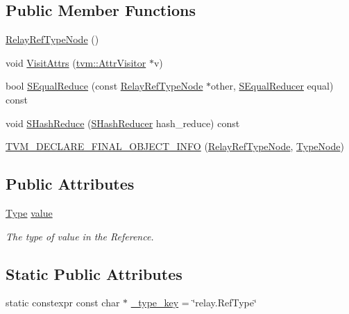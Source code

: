 \subsection*{Public Member Functions}
\begin{DoxyCompactItemize}
\item 
\hyperlink{classtvm_1_1RelayRefTypeNode_a23840592da71d366e7f7dbaaf42d906d}{Relay\+Ref\+Type\+Node} ()
\item 
void \hyperlink{classtvm_1_1RelayRefTypeNode_a365f797bb929e42a2199b51ed2f879f0}{Visit\+Attrs} (\hyperlink{classtvm_1_1AttrVisitor}{tvm\+::\+Attr\+Visitor} $\ast$v)
\item 
bool \hyperlink{classtvm_1_1RelayRefTypeNode_abe200e4f22df8db45ac083544df1f08f}{S\+Equal\+Reduce} (const \hyperlink{classtvm_1_1RelayRefTypeNode}{Relay\+Ref\+Type\+Node} $\ast$other, \hyperlink{classtvm_1_1SEqualReducer}{S\+Equal\+Reducer} equal) const 
\item 
void \hyperlink{classtvm_1_1RelayRefTypeNode_a70e4a9a304f6cd763ea25168fbea43d4}{S\+Hash\+Reduce} (\hyperlink{classtvm_1_1SHashReducer}{S\+Hash\+Reducer} hash\+\_\+reduce) const 
\item 
\hyperlink{classtvm_1_1RelayRefTypeNode_ac5cbe55647c2f0fe3158c9204c6d4d4a}{T\+V\+M\+\_\+\+D\+E\+C\+L\+A\+R\+E\+\_\+\+F\+I\+N\+A\+L\+\_\+\+O\+B\+J\+E\+C\+T\+\_\+\+I\+N\+FO} (\hyperlink{classtvm_1_1RelayRefTypeNode}{Relay\+Ref\+Type\+Node}, \hyperlink{classtvm_1_1TypeNode}{Type\+Node})
\end{DoxyCompactItemize}
\subsection*{Public Attributes}
\begin{DoxyCompactItemize}
\item 
\hyperlink{classtvm_1_1Type}{Type} \hyperlink{classtvm_1_1RelayRefTypeNode_a33bd13239d0b1da8b3ea0190d4f21069}{value}
\begin{DoxyCompactList}\small\item\em The type of value in the Reference. \end{DoxyCompactList}\end{DoxyCompactItemize}
\subsection*{Static Public Attributes}
\begin{DoxyCompactItemize}
\item 
static constexpr const char $\ast$ \hyperlink{classtvm_1_1RelayRefTypeNode_a2ad91e4a88467c9d1ab9bcd154c1d85b}{\+\_\+type\+\_\+key} = \char`\"{}relay.\+Ref\+Type\char`\"{}
\end{DoxyCompactItemize}


